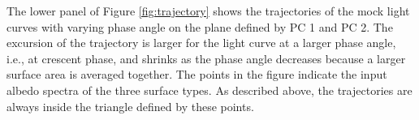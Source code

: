 \documentclass[iop,numberedappendix,apj,]{emulateapj}
\begin{document}
The lower panel of Figure \ref{fig:trajectory} shows the trajectories of the mock light curves with varying phase angle on the plane defined by PC 1 and PC 2. 
The excursion of the trajectory is larger for the light curve at a larger phase angle, i.e., at crescent phase, and shrinks as the phase angle decreases because a larger surface area is averaged together.  
The points in the figure indicate the input albedo spectra of the three surface types. 
As described above, the trajectories are always inside the triangle defined by these points. 



 
\end{document}
